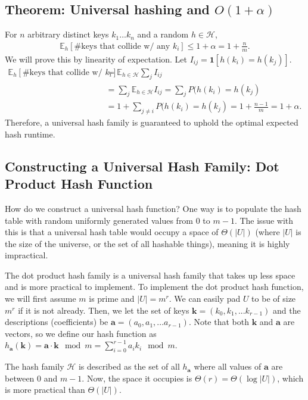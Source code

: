 \documentclass[10pt]{article}
\begin{document}
\subsection*{Theorem: Universal hashing and $O(1 + \alpha)$}
For $n$ arbitrary distinct keys $k_1 ... k_n$ and a random $h \in \mathcal{H}$,
\begin{align*}
    \mathbb{E}_h\left[\text{\# keys that collide w/ any } k_i\right] \leq 1 + \alpha = 1 + \frac{n}{m}.
\end{align*}
We will prove this by linearity of expectation. Let $I_{ij} = \mathbf{1}\left[h(k_i) = h(k_j)\right]$.
\begin{align*}
    \mathbb{E}_h\left[\text{\# keys that collide w/ } k_i\right] &= \mathbb{E}_{h \in \mathcal{H}} \sum_j I_{ij}\\
    &= \sum_j \mathbb{E}_{h \in \mathcal{H}}I_{ij} = \sum_j P(h(k_i) = h(k_j)\\
    &= 1 + \sum_{j \neq i} P(h(k_i) = h(k_j) = 1 + \frac{n-1}{m} = 1 + \alpha.
\end{align*}
Therefore, a universal hash family is guaranteed to uphold the optimal expected hash runtime.
\subsection*{Constructing a Universal Hash Family: Dot Product Hash Function}
How do we construct a universal hash function? One way is to populate the hash table with random uniformly generated values from $0$ to $m-1$. The issue with this is that a universal hash table would occupy a space of $\Theta(|U|)$ (where $|U|$ is the size of the universe, or the set of all hashable things), meaning it is highly impractical.

The dot product hash family is a universal hash family that takes up less space and is more practical to implement. To implement the dot product hash function, we will first assume $m$ is prime and $|U| = m^r$. We can easily pad $U$ to be of size $m^r$ if it is not already. Then, we let the set of keys $\mathbf{k} = (k_0, k_1, ... k_{r-1})$ and the descriptions (coefficients) be $\mathbf{a} = (a_0, a_1, ... a_{r-1})$. Note that both $\mathbf{k}$ and $\mathbf{a}$ are vectors, so we define our hash function as $h_{\mathbf{a}} (\mathbf{k}) = \mathbf{a} \cdot \mathbf{k} \mod m = \sum_{i=0}^{r-1} a_i k_i \mod m$.

The hash family $\mathcal{H}$ is described as the set of all $h_{\mathbf{a}}$ where all values of $\mathbf{a}$ are between 0 and $m-1$. Now, the space it occupies is $\Theta(r) = \Theta(\log |U|)$, which is more practical than $\Theta(|U|)$.
\end{document}
